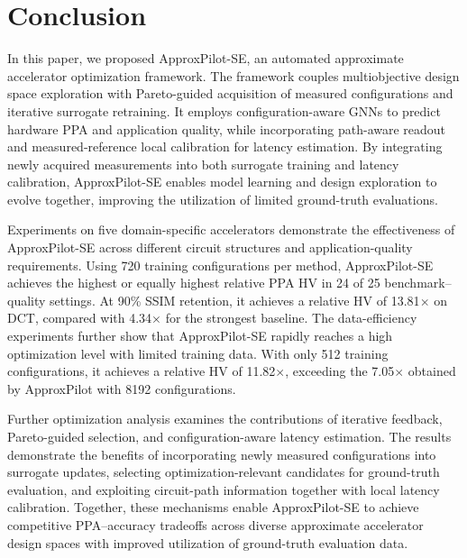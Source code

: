 
\section{Conclusion}
\label{sec:conclusion}

In this paper, we proposed ApproxPilot-SE, an automated approximate accelerator optimization framework. The framework couples multiobjective design space exploration with Pareto-guided acquisition of measured configurations and iterative surrogate retraining. It employs configuration-aware GNNs to predict hardware PPA and application quality, while incorporating path-aware readout and measured-reference local calibration for latency estimation. By integrating newly acquired measurements into both surrogate training and latency calibration, ApproxPilot-SE enables model learning and design exploration to evolve together, improving the utilization of limited ground-truth evaluations.

Experiments on five domain-specific accelerators demonstrate the effectiveness of ApproxPilot-SE across different circuit structures and application-quality requirements. Using 720 training configurations per method, ApproxPilot-SE achieves the highest or equally highest relative PPA HV in 24 of 25 benchmark--quality settings. At 90\% SSIM retention, it achieves a relative HV of 13.81$\times$ on DCT, compared with 4.34$\times$ for the strongest baseline. The data-efficiency experiments further show that ApproxPilot-SE rapidly reaches a high optimization level with limited training data. With only 512 training configurations, it achieves a relative HV of 11.82$\times$, exceeding the 7.05$\times$ obtained by ApproxPilot with 8192 configurations.

Further optimization analysis examines the contributions of iterative feedback, Pareto-guided selection, and configuration-aware latency estimation. The results demonstrate the benefits of incorporating newly measured configurations into surrogate updates, selecting optimization-relevant candidates for ground-truth evaluation, and exploiting circuit-path information together with local latency calibration. Together, these mechanisms enable ApproxPilot-SE to achieve competitive PPA--accuracy tradeoffs across diverse approximate accelerator design spaces with improved utilization of ground-truth evaluation data.

